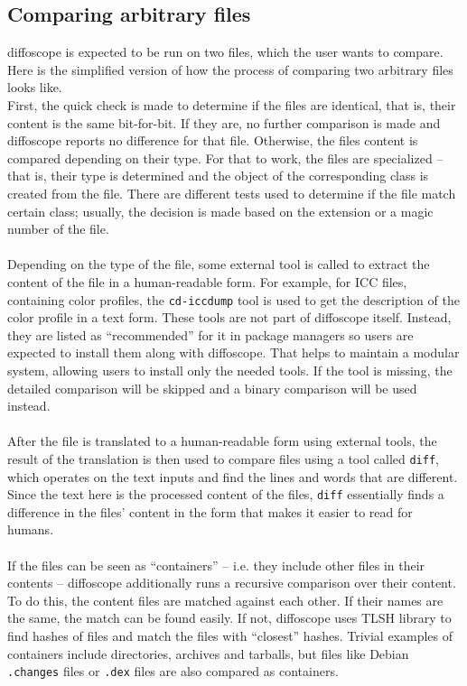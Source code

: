\subsection[Comparing arbitrary files]{Comparing arbitrary files}

diffoscope is expected to be run on two files, which the user wants to compare. Here is the simplified version of how the process of comparing two arbitrary files looks like.\\
First, the quick check is made to determine if the files are identical, that is, their content is the same bit-for-bit. If they are, no further comparison is made and diffoscope reports no difference for that file. 
Otherwise, the files content is compared depending on their type. For that to work, the files are specialized -- that is, their type is determined and the object of the corresponding class is created from the file. There are different tests used to determine if the file match certain class; usually, the decision is made based on the extension or a magic number of the file.\\\\
Depending on the type of the file, some external tool is called to extract the content of the file in a human-readable form. For example, for ICC files, containing color profiles, the \texttt{cd-iccdump} tool is used to get the description of the color profile in a text form. These tools are not part of diffoscope itself. Instead, they are listed as ``recommended'' for it in package managers so users are expected to install them along with diffoscope. That helps to maintain a modular system, allowing users to install only the needed tools. If the tool is missing, the detailed comparison will be skipped and a binary comparison will be used instead.\\\\
After the file is translated to a human-readable form using external tools, the result of the translation is then used to compare files using a tool called \texttt{diff}, which operates on the text inputs and find the lines and words that are different. Since the text here is the processed content of the files, \texttt{diff} essentially finds a difference in the files' content in the form that makes it easier to read for humans.\\\\
If the files can be seen as ``containers'' -- i.e. they include other files in their contents -- diffoscope additionally runs a recursive comparison over their content. To do this, the content files are matched against each other. If their names are the same, the match can be found easily. If not, diffoscope uses TLSH library\autocite{oliver2013tlsh} to find hashes of files and match the files with ``closest'' hashes. Trivial examples of containers include directories, archives and tarballs, but files like Debian \texttt{.changes} files or \texttt{.dex} files are also compared as containers.\\\\
